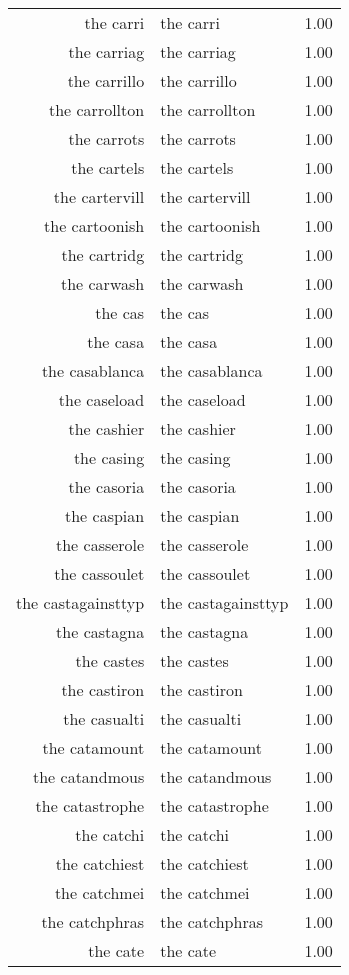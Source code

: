 \begin{table}[ht]
\begin{tabular}{rlr}
  the carri & the carri & 1.00 \\ 
  the carriag & the carriag & 1.00 \\ 
  the carrillo & the carrillo & 1.00 \\ 
  the carrollton & the carrollton & 1.00 \\ 
  the carrots & the carrots & 1.00 \\ 
  the cartels & the cartels & 1.00 \\ 
  the cartervill & the cartervill & 1.00 \\ 
  the cartoonish & the cartoonish & 1.00 \\ 
  the cartridg & the cartridg & 1.00 \\ 
  the carwash & the carwash & 1.00 \\ 
  the cas & the cas & 1.00 \\ 
  the casa & the casa & 1.00 \\ 
  the casablanca & the casablanca & 1.00 \\ 
  the caseload & the caseload & 1.00 \\ 
  the cashier & the cashier & 1.00 \\ 
  the casing & the casing & 1.00 \\ 
  the casoria & the casoria & 1.00 \\ 
  the caspian & the caspian & 1.00 \\ 
  the casserole & the casserole & 1.00 \\ 
  the cassoulet & the cassoulet & 1.00 \\ 
  the castagainsttyp & the castagainsttyp & 1.00 \\ 
  the castagna & the castagna & 1.00 \\ 
  the castes & the castes & 1.00 \\ 
  the castiron & the castiron & 1.00 \\ 
  the casualti & the casualti & 1.00 \\ 
  the catamount & the catamount & 1.00 \\ 
  the catandmous & the catandmous & 1.00 \\ 
  the catastrophe & the catastrophe & 1.00 \\ 
  the catchi & the catchi & 1.00 \\ 
  the catchiest & the catchiest & 1.00 \\ 
  the catchmei & the catchmei & 1.00 \\ 
  the catchphras & the catchphras & 1.00 \\ 
  the cate & the cate & 1.00 \\ 

\end{tabular}
\end{table}
